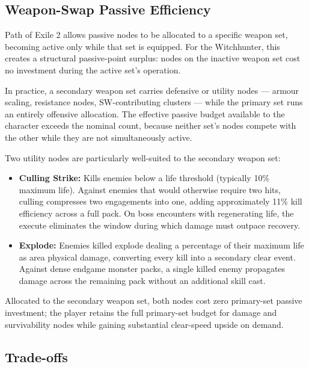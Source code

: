 \documentclass[12pt, letterpaper]{article}
\begin{document}
\subsection*{Weapon-Swap Passive Efficiency}

Path of Exile 2 allows passive nodes to be allocated to a specific weapon set, becoming active only while that set is equipped. For the Witchhunter, this creates a structural passive-point surplus: nodes on the inactive weapon set cost no investment during the active set's operation.

In practice, a secondary weapon set carries defensive or utility nodes --- armour scaling, resistance nodes, SW-contributing clusters --- while the primary set runs an entirely offensive allocation. The effective passive budget available to the character exceeds the nominal count, because neither set's nodes compete with the other while they are not simultaneously active.

Two utility nodes are particularly well-suited to the secondary weapon set:

\begin{itemize}
    \item \textbf{Culling Strike:} Kills enemies below a life threshold (typically 10\% maximum life). Against enemies that would otherwise require two hits, culling compresses two engagements into one, adding approximately 11\% kill efficiency across a full pack. On boss encounters with regenerating life, the execute eliminates the window during which damage must outpace recovery.
    \item \textbf{Explode:} Enemies killed explode dealing a percentage of their maximum life as area physical damage, converting every kill into a secondary clear event. Against dense endgame monster packs, a single killed enemy propagates damage across the remaining pack without an additional skill cast.
\end{itemize}

Allocated to the secondary weapon set, both nodes cost zero primary-set passive investment; the player retains the full primary-set budget for damage and survivability nodes while gaining substantial clear-speed upside on demand.

\subsection*{Trade-offs}
\end{document}
